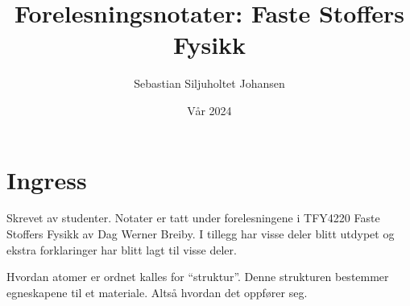 \documentclass{article}
\title{Forelesningsnotater: Faste Stoffers Fysikk}
\author{Sebastian Siljuholtet Johansen }
\date{Vår 2024}
\begin{document}
\maketitle

\nyside
\section*{Ingress}
Skrevet av studenter. Notater er tatt under forelesningene i TFY4220 Faste Stoffers Fysikk av Dag Werner Breiby. I tillegg har visse deler blitt utdypet og ekstra forklaringer har blitt lagt til visse deler.
\nyside
\tableofcontents

\nyside
{}
Hvordan atomer er ordnet kalles for \enquote{struktur}. Denne strukturen bestemmer egneskapene til et materiale. Altså hvordan det oppfører seg.
\end{document}
